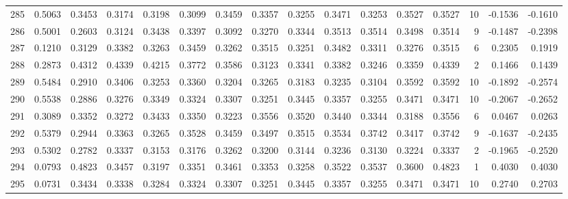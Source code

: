 \begin{tabular}{lrrrrrrrrrrrrrrr}
285 &      0.5063 &  0.3453 &  0.3174 &  0.3198 &  0.3099 &  0.3459 &  0.3357 &  0.3255 &  0.3471 &  0.3253 &   0.3527 &     0.3527 &     10 &                   -0.1536 &                    -0.1610 \\
286 &      0.5001 &  0.2603 &  0.3124 &  0.3438 &  0.3397 &  0.3092 &  0.3270 &  0.3344 &  0.3513 &  0.3514 &   0.3498 &     0.3514 &      9 &                   -0.1487 &                    -0.2398 \\
287 &      0.1210 &  0.3129 &  0.3382 &  0.3263 &  0.3459 &  0.3262 &  0.3515 &  0.3251 &  0.3482 &  0.3311 &   0.3276 &     0.3515 &      6 &                    0.2305 &                     0.1919 \\
288 &      0.2873 &  0.4312 &  0.4339 &  0.4215 &  0.3772 &  0.3586 &  0.3123 &  0.3341 &  0.3382 &  0.3246 &   0.3359 &     0.4339 &      2 &                    0.1466 &                     0.1439 \\
289 &      0.5484 &  0.2910 &  0.3406 &  0.3253 &  0.3360 &  0.3204 &  0.3265 &  0.3183 &  0.3235 &  0.3104 &   0.3592 &     0.3592 &     10 &                   -0.1892 &                    -0.2574 \\
290 &      0.5538 &  0.2886 &  0.3276 &  0.3349 &  0.3324 &  0.3307 &  0.3251 &  0.3445 &  0.3357 &  0.3255 &   0.3471 &     0.3471 &     10 &                   -0.2067 &                    -0.2652 \\
291 &      0.3089 &  0.3352 &  0.3272 &  0.3433 &  0.3350 &  0.3223 &  0.3556 &  0.3520 &  0.3440 &  0.3344 &   0.3188 &     0.3556 &      6 &                    0.0467 &                     0.0263 \\
292 &      0.5379 &  0.2944 &  0.3363 &  0.3265 &  0.3528 &  0.3459 &  0.3497 &  0.3515 &  0.3534 &  0.3742 &   0.3417 &     0.3742 &      9 &                   -0.1637 &                    -0.2435 \\
293 &      0.5302 &  0.2782 &  0.3337 &  0.3153 &  0.3176 &  0.3262 &  0.3200 &  0.3144 &  0.3236 &  0.3130 &   0.3224 &     0.3337 &      2 &                   -0.1965 &                    -0.2520 \\
294 &      0.0793 &  0.4823 &  0.3457 &  0.3197 &  0.3351 &  0.3461 &  0.3353 &  0.3258 &  0.3522 &  0.3537 &   0.3600 &     0.4823 &      1 &                    0.4030 &                     0.4030 \\
295 &      0.0731 &  0.3434 &  0.3338 &  0.3284 &  0.3324 &  0.3307 &  0.3251 &  0.3445 &  0.3357 &  0.3255 &   0.3471 &     0.3471 &     10 &                    0.2740 &                     0.2703 \\

\end{tabular}
